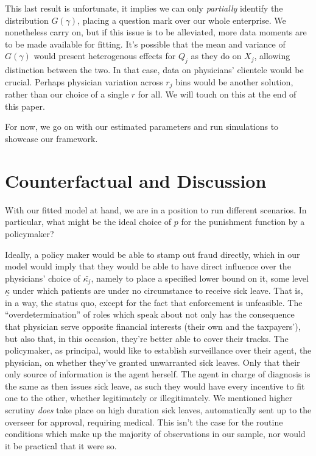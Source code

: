 \documentclass[../main.tex]{subfiles}
\begin{document}
This last result is unfortunate, it implies we can only \textit{partially} identify the distribution $G(\gamma)$, placing a question mark over our whole enterprise. We nonetheless carry on, but if this issue is to be alleviated, more data moments are to be made available for fitting. It's possible that the mean and variance of $G(\gamma)$ would present heterogenous effects for $Q_j$ as they do on $X_j$, allowing distinction between the two. In that case, data on physicians' clientele would be crucial. Perhaps physician variation across $r_j$ bins would be another solution, rather than our choice of a single $r$ for all. We will touch on this at the end of this paper.

For now, we go on with our estimated parameters and run simulations to showcase our framework.


\section{Counterfactual and Discussion}

With our fitted model at hand, we are in a position to run different scenarios. In particular, what might be the ideal choice of $p$ for the punishment function by a policymaker?

Ideally, a policy maker would be able to stamp out fraud directly, which in our model would imply that they would be able to have direct influence over the physicians' choice of $\bar{\kappa_j}$, namely to place a specified lower bound on it, some level $\underline{\kappa}$ under which patients are under no circumstance to receive sick leave. That is, in a way, the status quo, except for the fact that enforcement is unfeasible. The ``overdetermination'' of roles which \cite{markussen-roed} speak about not only has the consequence that physician serve opposite financial interests (their own and the taxpayers'), but also that, in this occasion, they're better able to cover their tracks. The policymaker, as principal, would like to establish surveillance over their agent, the physician, on whether they've granted unwarranted sick leaves. Only that their only source of information is the agent herself. The agent in charge of diagnosis is the same as then issues sick leave, as such they would have every incentive to fit one to the other, whether legitimately or illegitimately. We mentioned higher scrutiny \textit{does} take place on high duration sick leaves, automatically sent up to the overseer for approval, requiring medical. This isn't the case for the routine conditions which make up the majority of observations in our sample, nor would it be practical that it were so.
\end{document}

